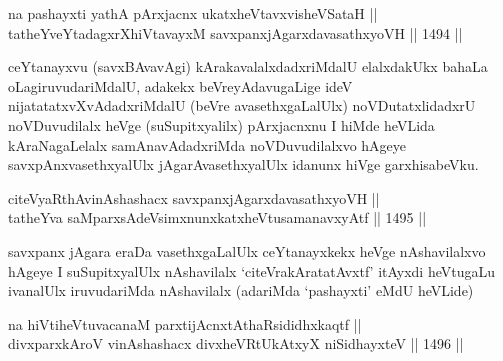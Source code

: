 \begin{shl}
na pashayxti yathA pArxjacnx ukatxheVtavxvisheVSataH || \\
tatheYveYtadagxrXhiVtavayxM \footnotemark[3]savxpanxjAgarxdavasathxyoVH ||  1494 ||  
\end{shl}

\begin{artha}
ceYtanayxvu (savxBAvavAgi) kArakavalalxdadxriMdalU elalxdakUkx bahaLa oLagiruvudariMdalU, adakekx beVreyAdavugaLige ideV nijatatatxvXvAdadxriMdalU (beVre avasethxgaLalUlx) noVDutatxlidadxrU noVDuvudilalx heVge (suSupitxyalilx) pArxjacnxnu I hiMde heVLida kAraNagaLelalx samAnavAdadxriMda noVDuvudilalxvo hAgeye savxpAnxvasethxyalUlx jAgarAvasethxyalUlx idanunx hiVge garxhisabeVku.
\end{artha}



\begin{shl}
citeVyaRthA\s vinAshashacx savxpanxjAgarxdavasathxyoVH || \\
tatheYva saMparxsAdeV\s simxnunxkatxheVtusamanavxyAtf ||  1495 ||  
\end{shl}

\begin{artha}
savxpanx jAgara eraDa vasethxgaLalUlx ceYtanayxkekx heVge nAshavilalxvo hAgeye I suSupitxyalUlx nAshavilalx `citeVrakAratatAvxtf' itAyxdi heVtugaLu ivanalUlx iruvudariMda nAshavilalx (adariMda `pashayxti' eMdU heVLide)
\end{artha}



\begin{shl}
na hiVtiheVtuvacanaM parxtijAcnxtAthaRsididhxkaqtf || \\
divxparxkAroV vinAshashacx divxheVRtUkAtxyX niSidhayxteV ||  1496 ||  
\end{shl}


